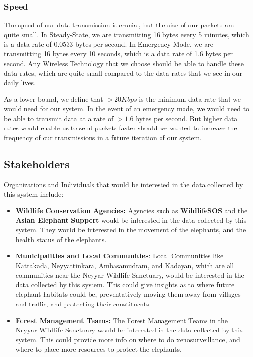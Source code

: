 \subsubsection{Speed}
The speed of our data transmission is crucial, but the size of our packets are quite small. In Steady-State, we are transmitting 16 bytes every 5 minutes, which is a data rate of 0.0533 bytes per second. In Emergency Mode, we are transmitting 16 bytes every 10 seconds, which is a data rate of 1.6 bytes per second. Any Wireless Technology that we choose should be able to handle these data rates, which are quite small compared to the data rates that we see in our daily lives.

As a lower bound, we define that $> 20 Kbps$ is the minimum data rate that we would need for our system. In the event of an emergency mode, we would need to be able to transmit data at a rate of $> 1.6$ bytes per second. But higher data rates would enable us to send packets faster should we wanted to increase the frequency of our transmissions in a future iteration of our system.

\subsection{Stakeholders}

Organizations and Individuals that would be interested in the data collected by this system include: 
\begin{itemize}
    \item \textbf{Wildlife Conservation Agencies:} Agencies such as \textbf{WildlifeSOS}\cite{wildlifesos} and the \textbf{Asian Elephant Support}\cite{aecp} would be interested in the data collected by this system. They would be interested in the movement of the elephants, and the health status of the elephants.
    \item \textbf{Municipalities and Local Communities}: Local Communities like Kattakada, Neyyattinkara, Ambasamudram, and Kadayan, which are all communities near the Neyyar Wildlife Sanctuary, would be interested in the data collected by this system. This could give insights as to where future elephant habitats could be, preventatively moving them away from villages and traffic, and protecting their constituents.
    \item \textbf{Forest Management Teams:} The Forest Management Teams in the Neyyar Wildlife Sanctuary would be interested in the data collected by this system. This could provide more info on where to do xenosurveillance, and where to place more resources to protect the elephants.
\end{itemize}

